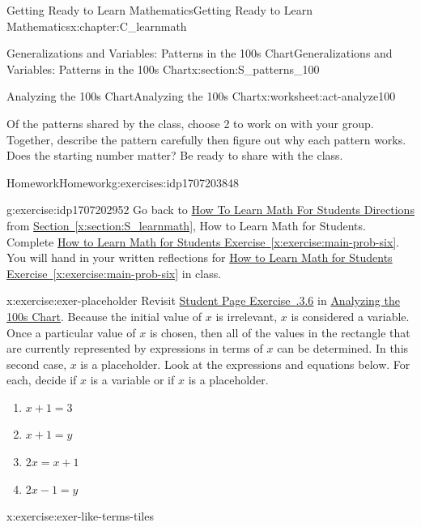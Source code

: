 \documentclass[oneside,10pt,]{book}
\newcommand{\xreffont}{\relax}
\numberwithin{equation}{chapter}
\begin{document}
\begin{chapterptx}{Getting Ready to Learn Mathematics}{}{Getting Ready to Learn Mathematics}{}{}{x:chapter:C_learnmath}
\begin{sectionptx}{Generalizations and Variables: Patterns in the 100s Chart}{}{Generalizations and Variables: Patterns in the 100s Chart}{}{}{x:section:S_patterns_100}
\begin{worksheet-subsection}{Analyzing the 100s Chart}{}{Analyzing the 100s Chart}{}{}{x:worksheet:act-analyze100}
\begin{conclusion}{}
\par
Of the patterns shared by the class, choose 2 to work on with your group. Together, describe the pattern carefully then figure out why each pattern works. Does the starting number matter? Be ready to share with the class.%
\end{conclusion}%
\end{worksheet-subsection}
\restoregeometry
%
%
\typeout{************************************************}
\typeout{************************************************}
%
\begin{exercises-subsection}{Homework}{}{Homework}{}{}{g:exercises:idp1707203848}
\begin{divisionexercise}{1}{}{}{g:exercise:idp1707202952}%
Go back to \hyperlink{x:paragraphs:htlmfs-directions}{How To Learn Math For Students Directions} from \hyperref[x:section:S_learnmath]{Section~{\xreffont\ref{x:section:S_learnmath}}}, How to Learn Math for Students. Complete \hyperref[x:exercise:main-prob-six]{How to Learn Math for Students Exercise~{\xreffont\ref{x:exercise:main-prob-six}}}. You will hand in your written reflections for \hyperref[x:exercise:main-prob-six]{How to Learn Math for Students Exercise~{\xreffont\ref{x:exercise:main-prob-six}}} in class.%
\end{divisionexercise}%
\begin{divisionexercise}{2}{}{}{x:exercise:exer-placeholder}%
Revisit \hyperlink{x:exercise:analyze100-x}{Student Page Exercise~{\xreffont 1.6.3.6}} in \hyperref[x:worksheet:act-analyze100]{Analyzing the 100s Chart}. Because the initial value of \(x\) is irrelevant, \(x\) is considered a variable. Once a particular value of \(x\) is chosen, then all of the values in the rectangle that are currently represented by expressions in terms of \(x\) can be determined. In this second case, \(x\) is a placeholder. Look at the expressions and equations below. For each, decide if \(x\) is a variable or if \(x\) is a placeholder.%
\begin{enumerate}[font=\bfseries,label=(\alph*),ref=\alph*]
\item{}\(x + 1 = 3\)%
\item{}\(x + 1 = y\)%
\item{}\(2x = x + 1\)%
\item{}\(2x - 1 = y\)%
\end{enumerate}
\end{divisionexercise}%
\begin{divisionexercise}{3}{}{}{x:exercise:exer-like-terms-tiles}%

\end{divisionexercise}
\end{exercises-subsection}
\end{sectionptx}
\end{chapterptx}
\end{document}
